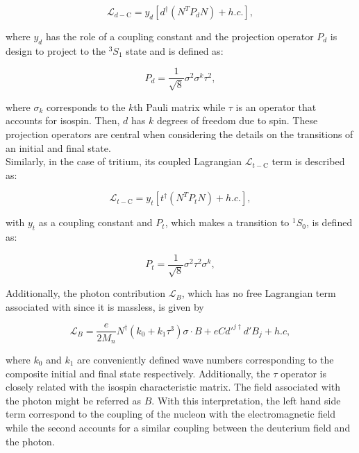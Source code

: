 \documentclass[openany]{book}
\begin{document}
 \begin{equation}\label{eq:micro_EFT_lagrangian_d_coupling}
	\mathcal{L}_{d-\mathrm{C}}  = y_d [d^{\dagger} (N^{T} P_d N) + h.c.],
\end{equation}

where $y_d$ has the role of a coupling constant and the projection operator $P_d$ is design to project to the ${}^{3}S_1$ state and is defined as: 

\begin{equation}\label{eq:micro_EFT_Pd}
	P_d = \frac{1}{\sqrt{8}} \sigma^2 \sigma^k \tau^2,
 \end{equation}

where $\sigma_k$ corresponds to the $k$th Pauli matrix while $\tau$ is an operator that accounts for isospin. Then, $d$ has $k$ degrees of freedom due to spin. These projection operators are central when considering the details on the transitions of an initial and final state. \\

Similarly, in the case of tritium, its coupled Lagrangian $\mathcal{L}_{t-\mathrm{C}}$ term is described as: 

\begin{equation}\label{eq:micro_EFT_lagrangian_t_coupling}
	\mathcal{L}_{t-\mathrm{C}}  = y_t [t^{\dagger} (N^{T} P_t N) + h.c.],
\end{equation}

with $y_t$ as a coupling constant and $P_t$, which makes a transition to $^{1}S_0$, is defined as: 

\begin{equation}\label{eq:micro_EFT_Pt}
	P_t = \frac{1}{\sqrt{8}} \sigma^2 \tau^2 \sigma^k,
\end{equation}

Additionally, the photon contribution $\mathcal{L}_B$, which has no free Lagrangian term associated with since it is massless,  is given by 

\begin{equation}\label{eq:micro_EFT_lagrangian_B}
	\mathcal{L}_B = \frac{e}{2M_n} N^\dagger (k_0 + k_1 \tau^3) \sigma \cdot B + e C d'^{j\dagger}  d' B_j + h.c,
\end{equation}

where $k_0$ and $k_1$ are conveniently defined wave numbers corresponding to the composite initial and final state respectively. Additionally, the $\tau$ operator is closely related with the isospin characteristic matrix. The field associated with the photon might be referred as $B$. With this interpretation, the left hand side term correspond to the coupling of the nucleon with the electromagnetic field while the second accounts for a similar coupling between the deuterium field and the photon.  \\
\end{document}
